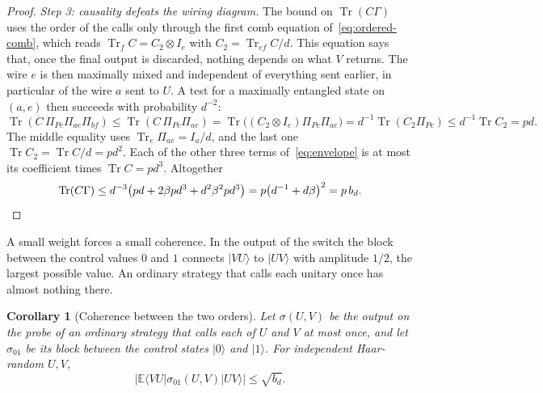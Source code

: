 \documentclass[11pt,letterpaper]{article}
\newtheorem{corollary}[theorem]{Corollary}
\theoremstyle{definition}\newtheorem{definition}[theorem]{Definition}
\newcommand{\E}{\mathbb E}
\newcommand{\Tr}{\operatorname{Tr}}
\newcommand{\ket}[1]{\lvert#1\rangle}
\newcommand{\bra}[1]{\langle#1\rvert}
\begin{document}
\begin{proof}
\emph{Step 3: causality defeats the wiring diagram.} The bound on
$\Tr(C\Gamma)$ uses the order of the calls only through the first comb
equation of~\eqref{eq:ordered-comb}, which reads
$\Tr_fC=C_2\otimes I_e$ with $C_2=\Tr_{ef}C/d$. This equation says
that, once the final output is discarded, nothing depends on what $V$
returns. The wire $e$ is then maximally mixed and
independent of everything sent earlier, in particular of the wire $a$
sent to $U$. A test for a maximally entangled state on $(a,e)$
then succeeds with probability $d^{-2}$:
\[
 \Tr(C\,\Pi_{Pc}\Pi_{ae}\Pi_{bf})
 \le\Tr(C\,\Pi_{Pc}\Pi_{ae})
 =\Tr\bigl((C_2\otimes I_e)\Pi_{Pc}\Pi_{ae}\bigr)
 =d^{-1}\Tr(C_2\Pi_{Pc})\le d^{-1}\Tr C_2=pd .
\]
The middle equality uses $\Tr_e\Pi_{ae}=I_a/d$, and the last one
$\Tr C_2=\Tr C/d=pd^2$. Each of the other three terms
of~\eqref{eq:envelope} is at most its coefficient times
$\Tr C=pd^3$. Altogether
\[
 \Tr(C\Gamma)\le d^{-3}\bigl(pd+2\beta pd^3+d^2\beta^2pd^3\bigr)
 =p\bigl(d^{-1}+d\beta\bigr)^2=p\,b_d . \qedhere
\]
\end{proof}

A small weight forces a small coherence. In the output of
the switch the block
between the control values $0$ and $1$ connects $\ket{VU}$ to
$\ket{UV}$ with amplitude $1/2$, the largest possible value. An
ordinary strategy that calls each unitary once has almost nothing
there.

\begin{corollary}[Coherence between the two orders]\label{cor:coherence}
Let $\sigma(U,V)$ be the output on the probe of an ordinary strategy
that calls each of $U$ and $V$ at most once, and let $\sigma_{01}$ be
its block between the control states $\ket0$ and $\ket1$. For
independent Haar-random $U,V$,
\begin{equation}\label{eq:coherence}
 \left|\E\bra{VU}\sigma_{01}(U,V)\ket{UV}\right|\le\sqrt{b_d}.
\end{equation}
\end{corollary}
\end{document}
